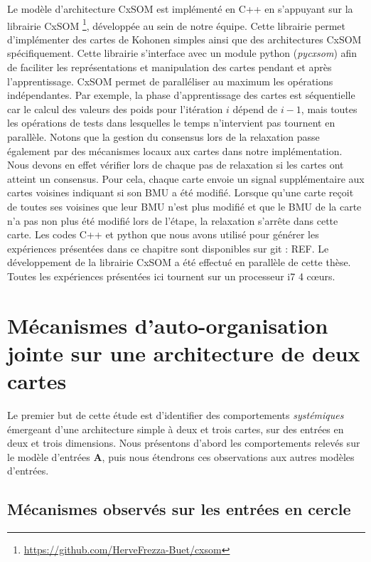 \documentclass[../main]{subfiles}
\begin{document}
Le modèle d'architecture CxSOM est implémenté en C++ en s'appuyant sur la librairie CxSOM \footnote{\url{https://github.com/HerveFrezza-Buet/cxsom}}, développée au sein de notre équipe.
Cette librairie permet d'implémenter des cartes de Kohonen simples ainsi que des architectures CxSOM spécifiquement.
Cette librairie s'interface avec un module python (\emph{pycxsom}) afin de faciliter les représentations et manipulation des cartes pendant et après l'apprentissage.
CxSOM permet de paralléliser au maximum les opérations indépendantes. Par exemple, la phase d'apprentissage des cartes est séquentielle car le calcul des valeurs des poids pour l'itération $i$ dépend de $i-1$, mais toutes les opérations de tests dans lesquelles le temps n'intervient pas tournent en parallèle.
Notons que la gestion du consensus lors de la relaxation passe également par des mécanismes locaux aux cartes dans notre implémentation. 
Nous devons en effet vérifier lors de chaque pas de relaxation si les cartes ont atteint un consensus. Pour cela, chaque carte envoie un signal supplémentaire aux cartes voisines indiquant si son BMU a été modifié. Lorsque qu'une carte reçoit de toutes ses voisines que leur BMU n'est plus modifié et que le BMU de la carte n'a pas non plus été modifié lors de l'étape, la relaxation s'arrête dans cette carte.
Les codes C++ et python que nous avons utilisé pour générer les expériences présentées dans ce chapitre sont disponibles sur git : REF.
Le développement de la librairie CxSOM a été effectué en parallèle de cette thèse. 
Toutes les expériences présentées ici tournent sur un processeur i7 4 c\oe{}urs.



\section{Mécanismes d'auto-organisation jointe sur une architecture de deux cartes}

Le premier but de cette étude est d'identifier des comportements \emph{systémiques} émergeant d'une architecture simple à deux et trois cartes, sur des entrées en deux et trois dimensions. Nous présentons d'abord les comportements relevés sur le modèle d'entrées \textbf{A}, puis nous étendrons ces observations aux autres modèles d'entrées.

\subsection{Mécanismes observés sur les entrées en cercle}
\end{document}
